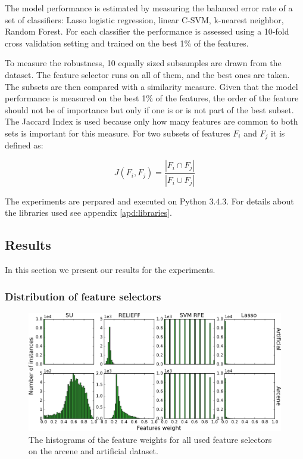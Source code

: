 \documentclass[twoside,11pt]{article}
\begin{document}
The model performance is estimated by measuring the balanced error rate of a set of classifiers: Lasso logistic regression, linear C-SVM, k-nearest neighbor, Random Forest. 
For each classifier the performance is assessed using a 10-fold cross validation setting and trained on the best 1\% of the features.

To measure the robustness, 10 equally sized subsamples are drawn from the dataset. The feature selector runs on all of them, and the best ones are taken. The subsets are then compared with a similarity measure. Given that the model performance is measured on the best 1\% of the features, the order of the feature should not be of importance but only if one is or is not part of the best subset. The Jaccard Index is used because only how many features are common to both sets is important for this measure. For two subsets of features $F_i$ and $F_j$ it is defined as:

\begin{equation}
J(F_i, F_j) = \frac{| F_i \cap F_j |}{| F_i \cup F_j |}
\end{equation}

The experiments are perpared and executed on Python 3.4.3. For details about the libraries used see appendix \ref{apd:libraries}.

\subsection{Results}
In this section we present our results for the experiments. %
\subsubsection{Distribution of feature selectors}
\begin{figure}[h!]
  \centering
    \includegraphics[width=\textwidth]{images/feature_weights_hist_arcene_artificial.png}
  \caption{The histograms of the feature weights for all used feature selectors on the arcene and artificial dataset.}
  \label{fig:feature_weights_hist_arcene_artificial}
\end{figure}
\end{document}
